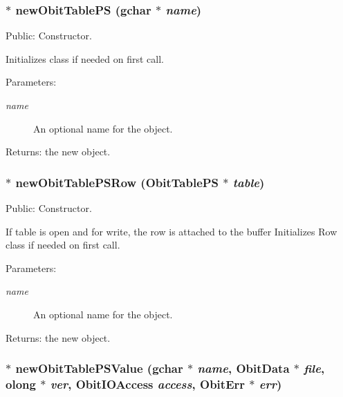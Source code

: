 \subsubsection{$\ast$ new\-Obit\-Table\-PS (gchar $\ast$ {\em name})}\label{ObitTablePS_8c_a16}


Public: Constructor. 

Initializes class if needed on first call. \begin{Desc}
\item[Parameters:]
\begin{description}
\item[{\em name}]An optional name for the object. \end{description}
\end{Desc}
\begin{Desc}
\item[Returns:]the new object. \end{Desc}
\subsubsection{$\ast$ new\-Obit\-Table\-PSRow ({\bf Obit\-Table\-PS} $\ast$ {\em table})}\label{ObitTablePS_8c_a14}


Public: Constructor. 

If table is open and for write, the row is attached to the buffer Initializes Row class if needed on first call. \begin{Desc}
\item[Parameters:]
\begin{description}
\item[{\em name}]An optional name for the object. \end{description}
\end{Desc}
\begin{Desc}
\item[Returns:]the new object. \end{Desc}
\subsubsection{$\ast$ new\-Obit\-Table\-PSValue (gchar $\ast$ {\em name}, {\bf Obit\-Data} $\ast$ {\em file}, {\bf olong} $\ast$ {\em ver}, Obit\-IOAccess {\em access}, {\bf Obit\-Err} $\ast$ {\em err})}\label{ObitTablePS_8c_a18}


